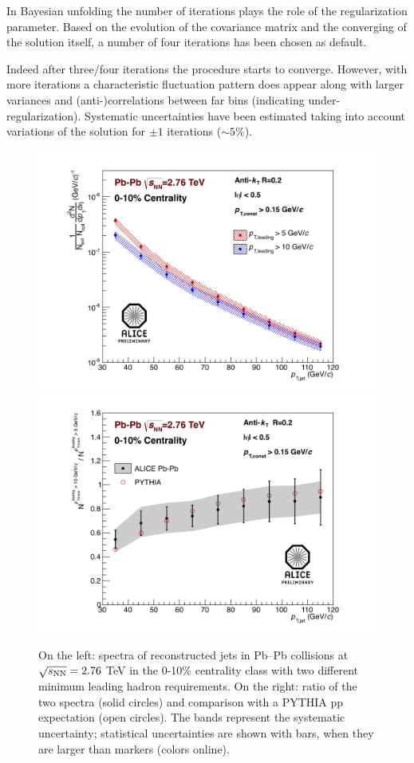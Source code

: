 \documentclass[a4paper]{jpconf}
\begin{document}
In Bayesian unfolding the number of iterations plays the role of the regularization parameter. Based on 
the evolution of the covariance matrix and the converging of the solution itself, a number of four iterations
has been chosen as default. 

Indeed after three/four iterations the procedure starts to converge. However, with more iterations
a characteristic fluctuation pattern does appear along with larger variances and (anti-)correlations between
far bins (indicating under-regularization).
Systematic uncertainties have been estimated taking into account variations
of the solution for $\pm 1$ iterations ($\sim 5\%$).


\begin{figure}[t]
\centering
{\includegraphics[width=.44\columnwidth]{FinalSpectraR02_5GeV_10GeV} } \quad %
{\includegraphics[width=.44\columnwidth]{FinalSpectraRatioR02_5GeV_10GeV} }%
\caption{On the left: spectra of reconstructed jets in Pb--Pb collisions at $\sqrt{s_{\rm NN}}=2.76$ TeV in the 0-10\% centrality class 
with two different minimum leading hadron \pT{} requirements.  On the right: ratio of the two spectra (solid circles) and comparison
 with a PYTHIA pp expectation (open circles). The bands represent the systematic uncertainty; statistical uncertainties
are shown with bars, when they are larger than markers (colors online).}
\label{fig:FinalSpectraLHRAndRatio}
\end{figure}
\end{document}
